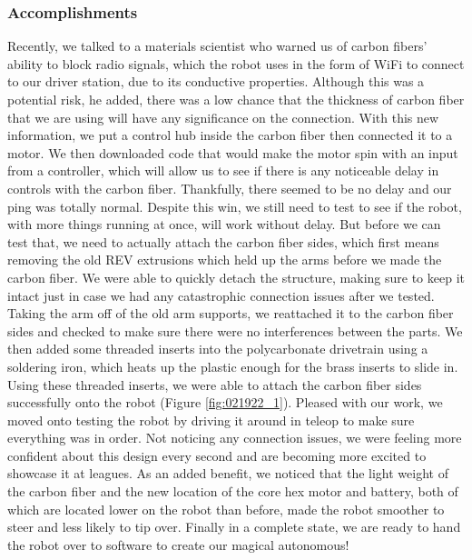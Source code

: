 \subsubsection*{Accomplishments}
Recently, we talked to a materials scientist who warned us of carbon fibers' ability to block radio signals, which the robot uses in the form of WiFi to connect to our driver station, due to its conductive properties. Although this was a potential risk, he added, there was a low chance that the thickness of carbon fiber that we are using will have any significance on the connection. With this new information, we put a control hub inside the carbon fiber then connected it to a motor. We then downloaded code that would make the motor spin with an input from a controller, which will allow us to see if there is any noticeable delay in controls with the carbon fiber. Thankfully, there seemed to be no delay and our ping was totally normal. Despite this win, we still need to test to see if the robot, with more things running at once, will work without delay.
But before we can test that, we need to actually attach the carbon fiber sides, which first means removing the old REV extrusions which held up the arms before we made the carbon fiber. We were able to quickly detach the structure, making sure to keep it intact just in case we had any catastrophic connection issues after we tested. Taking the arm off of the old arm supports, we reattached it to the carbon fiber sides and checked to make sure there were no interferences between the parts. We then added some threaded inserts into the polycarbonate drivetrain using a soldering iron, which heats up the plastic enough for the brass inserts to slide in. Using these threaded inserts, we were able to attach the carbon fiber sides successfully onto the robot (Figure \ref{fig:021922_1}). 
Pleased with our work, we moved onto testing the robot by driving it around in teleop to make sure everything was in order. Not noticing any connection issues, we were feeling more confident about this design every second and are becoming more excited to showcase it at leagues. As an added benefit, we noticed that the light weight of the carbon fiber and the new location of the core hex motor and battery, both of which are located lower on the robot than before,  made the robot smoother to steer and less likely to tip over. Finally in a complete state, we are ready to hand the robot over to software to create our magical autonomous!


